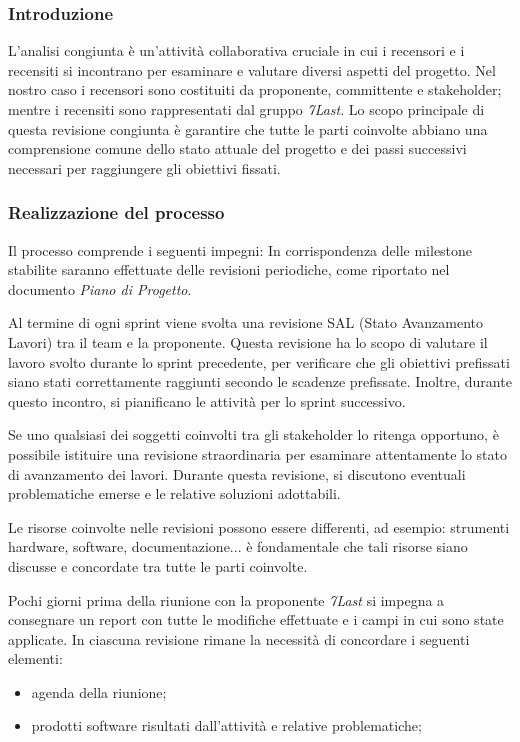 \subsubsection{Introduzione}
L'analisi congiunta è un'attività collaborativa cruciale in cui i recensori e i recensiti si incontrano per esaminare e valutare diversi aspetti del progetto.  Nel nostro caso i recensori sono costituiti da proponente, committente e stakeholder; mentre i recensiti sono rappresentati dal gruppo \textit{7Last}. Lo scopo principale di questa revisione congiunta è garantire che tutte le parti coinvolte abbiano una comprensione comune dello stato attuale del progetto e dei passi successivi necessari per raggiungere gli obiettivi fissati.

\subsubsection{Realizzazione del processo}
Il processo comprende i seguenti impegni:
In corrispondenza delle milestone stabilite saranno effettuate delle revisioni periodiche, come riportato nel
documento \textit{Piano di Progetto}.

Al termine di ogni sprint viene svolta una revisione SAL
(Stato Avanzamento Lavori) tra il team e la proponente. Questa revisione ha lo scopo di valutare il lavoro svolto durante lo sprint precedente, per verificare che gli obiettivi prefissati siano stati correttamente raggiunti secondo le scadenze prefissate.
Inoltre, durante questo incontro, si pianificano le attività per lo sprint successivo.

Se uno qualsiasi dei soggetti coinvolti tra gli stakeholder lo ritenga opportuno, è possibile istituire una revisione straordinaria per esaminare attentamente lo stato di avanzamento dei lavori. Durante questa revisione, si discutono eventuali problematiche emerse e le relative soluzioni adottabili.

Le risorse coinvolte nelle revisioni possono essere differenti, ad esempio: strumenti hardware, software, documentazione... è fondamentale che tali risorse siano discusse e concordate tra tutte le parti coinvolte.

Pochi giorni prima della riunione con la proponente \textit{7Last} si impegna a consegnare un report con tutte le modifiche effettuate e i campi in cui sono state applicate.
In ciascuna revisione rimane la necessità di concordare i seguenti elementi:
\begin{itemize}
	\item agenda della riunione;
	\item prodotti software risultati dall'attività e relative problematiche;
\end{itemize}

